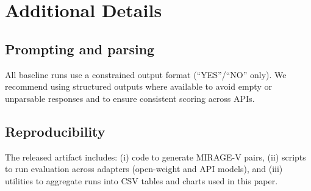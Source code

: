 \section{Additional Details}
\subsection{Prompting and parsing}
All baseline runs use a constrained output format (``YES''/``NO'' only). 
We recommend using structured outputs where available to avoid empty or unparsable responses and to ensure consistent scoring across APIs.

\subsection{Reproducibility}
The released artifact includes:
(i) code to generate MIRAGE-V pairs, 
(ii) scripts to run evaluation across adapters (open-weight and API models), and 
(iii) utilities to aggregate runs into CSV tables and charts used in this paper.
